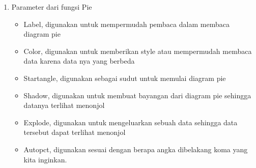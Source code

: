 \begin{enumerate}
\item Parameter dari fungsi Pie
\begin{itemize}
\item Label, digunakan untuk mempermudah pembaca dalam membaca diagram pie
\item Color, digunakan untuk memberikan style atau mempermudah membaca data karena data nya yang berbeda
\item Startangle, digunakan sebagai sudut untuk memulai diagram pie
\item Shadow, digunakan untuk membuat bayangan dari diagram pie sehingga datanya terlihat menonjol
\item Explode, digunakan untuk mengeluarkan sebuah data sehingga data tersebut dapat terlihat menonjol
\item Autopct, digunakan sesuai dengan berapa angka dibelakang koma yang kita inginkan.
\end{itemize}

\end{enumerate}


